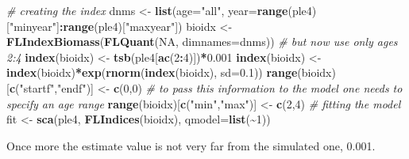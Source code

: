 \documentclass[
]{book}
\newenvironment{Shaded}{\begin{snugshade}}{\end{snugshade}}
\newcommand{\AttributeTok}[1]{\textcolor[rgb]{0.13,0.29,0.53}{#1}}
\newcommand{\CommentTok}[1]{\textcolor[rgb]{0.56,0.35,0.01}{\textit{#1}}}
\newcommand{\ConstantTok}[1]{\textcolor[rgb]{0.56,0.35,0.01}{#1}}
\newcommand{\DecValTok}[1]{\textcolor[rgb]{0.00,0.00,0.81}{#1}}
\newcommand{\FloatTok}[1]{\textcolor[rgb]{0.00,0.00,0.81}{#1}}
\newcommand{\FunctionTok}[1]{\textcolor[rgb]{0.13,0.29,0.53}{\textbf{#1}}}
\newcommand{\NormalTok}[1]{#1}
\newcommand{\OtherTok}[1]{\textcolor[rgb]{0.56,0.35,0.01}{#1}}
\newcommand{\SpecialCharTok}[1]{\textcolor[rgb]{0.81,0.36,0.00}{\textbf{#1}}}
\newcommand{\StringTok}[1]{\textcolor[rgb]{0.31,0.60,0.02}{#1}}
\begin{document}
\begin{Shaded}
\begin{Highlighting}[]
\CommentTok{\# creating the index}
\NormalTok{dnms }\OtherTok{\textless{}{-}} \FunctionTok{list}\NormalTok{(}\AttributeTok{age=}\StringTok{"all"}\NormalTok{, }\AttributeTok{year=}\FunctionTok{range}\NormalTok{(ple4)[}\StringTok{"minyear"}\NormalTok{]}\SpecialCharTok{:}\FunctionTok{range}\NormalTok{(ple4)[}\StringTok{"maxyear"}\NormalTok{])}
\NormalTok{bioidx }\OtherTok{\textless{}{-}} \FunctionTok{FLIndexBiomass}\NormalTok{(}\FunctionTok{FLQuant}\NormalTok{(}\ConstantTok{NA}\NormalTok{, }\AttributeTok{dimnames=}\NormalTok{dnms))}
\CommentTok{\# but now use only ages 2:4}
\FunctionTok{index}\NormalTok{(bioidx) }\OtherTok{\textless{}{-}} \FunctionTok{tsb}\NormalTok{(ple4[}\FunctionTok{ac}\NormalTok{(}\DecValTok{2}\SpecialCharTok{:}\DecValTok{4}\NormalTok{)])}\SpecialCharTok{*}\FloatTok{0.001}
\FunctionTok{index}\NormalTok{(bioidx) }\OtherTok{\textless{}{-}} \FunctionTok{index}\NormalTok{(bioidx)}\SpecialCharTok{*}\FunctionTok{exp}\NormalTok{(}\FunctionTok{rnorm}\NormalTok{(}\FunctionTok{index}\NormalTok{(bioidx), }\AttributeTok{sd=}\FloatTok{0.1}\NormalTok{))}
\FunctionTok{range}\NormalTok{(bioidx)[}\FunctionTok{c}\NormalTok{(}\StringTok{"startf"}\NormalTok{,}\StringTok{"endf"}\NormalTok{)] }\OtherTok{\textless{}{-}} \FunctionTok{c}\NormalTok{(}\DecValTok{0}\NormalTok{,}\DecValTok{0}\NormalTok{)}
\CommentTok{\# to pass this information to the model one needs to specify an age range}
\FunctionTok{range}\NormalTok{(bioidx)[}\FunctionTok{c}\NormalTok{(}\StringTok{"min"}\NormalTok{,}\StringTok{"max"}\NormalTok{)] }\OtherTok{\textless{}{-}} \FunctionTok{c}\NormalTok{(}\DecValTok{2}\NormalTok{,}\DecValTok{4}\NormalTok{)}
\CommentTok{\# fitting the model}
\NormalTok{fit }\OtherTok{\textless{}{-}} \FunctionTok{sca}\NormalTok{(ple4, }\FunctionTok{FLIndices}\NormalTok{(bioidx), }\AttributeTok{qmodel=}\FunctionTok{list}\NormalTok{(}\SpecialCharTok{\textasciitilde{}}\DecValTok{1}\NormalTok{))}
\end{Highlighting}
\end{Shaded}

Once more the estimate value is not very far from the simulated one, 0.001.

\begin{Shaded}
\end{Shaded}
\end{document}
